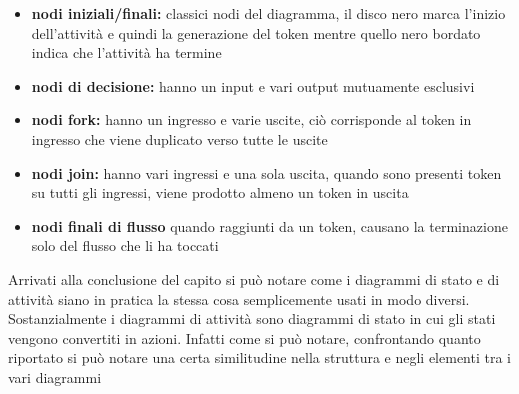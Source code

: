 \documentclass[a4paper, 11pt,oneside]{book}
\newcommand{\spacing}{\par\bigskip\noindent}
\begin{document}
        \begin{itemize}
            \item \textbf{nodi iniziali/finali:} classici nodi del diagramma, il disco nero marca l'inizio dell'attività e quindi la generazione del token mentre quello nero bordato indica che l'attività ha termine
            \item \textbf{nodi di decisione:} hanno un input e vari output mutuamente esclusivi
            \item \textbf{nodi fork:} hanno un ingresso e varie uscite, ciò corrisponde al token in ingresso che viene duplicato verso tutte le uscite
            \item \textbf{nodi join:} hanno vari ingressi e una sola uscita, quando sono presenti token su tutti gli ingressi, viene prodotto almeno un token in uscita
            \item \textbf{nodi finali di flusso} quando raggiunti da un token, causano la terminazione solo del flusso che li ha toccati
        \end{itemize}
        \spacing
        Arrivati alla conclusione del capito si può notare come i diagrammi di stato e di attività siano in pratica la stessa cosa semplicemente usati in modo diversi. Sostanzialmente i diagrammi di attività sono diagrammi di stato in cui gli stati vengono convertiti in azioni.
        Infatti come si può notare, confrontando quanto riportato si può notare una certa similitudine nella struttura e negli elementi tra i vari diagrammi



\end{document}
